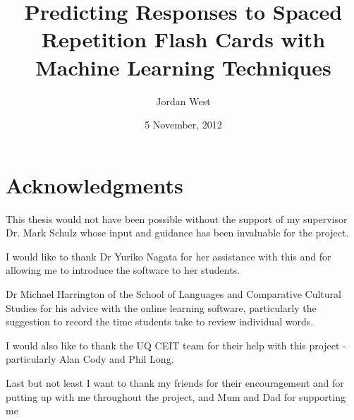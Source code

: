 \documentclass[a4paper]{article}
\title{Predicting Responses to Spaced Repetition Flash Cards with Machine Learning Techniques}
\date{5 November, 2012}
\author{Jordan West}
\begin{document}


\tableofcontents
\newpage











\section{Acknowledgments}
This thesis would not have been possible without the support of my
supervisor Dr. Mark Schulz whose input and guidance
has been invaluable for the project.

I would like to thank Dr Yuriko Nagata for her assistance with this and for allowing
me to introduce the software to her students.

Dr Michael Harrington of the School of Languages and Comparative Cultural Studies
for his advice with the online learning software, particularly the suggestion
to record the time students take to review individual words.

I would also like to thank the UQ CEIT team for their help with this project -
particularly Alan Cody and Phil Long.

Last but not least I want to thank my friends for their encouragement and
for putting up with me throughout the project, and Mum and Dad for supporting me
\end{document}
